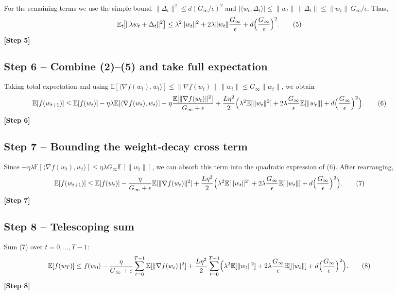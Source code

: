 \documentclass[11pt]{article}
\newcommand{\E}{\mathbb{E}}
\begin{document}
For the remaining terms we use the simple bound
$\|\Delta_{t}\|^{2}\le d(G_{\infty}/\epsilon)^{2}$ and
$|\langle w_{t},\Delta_{t}\rangle|\le\|w_{t}\|\,\|\Delta_{t}\|
\le \|w_{t}\|\,G_{\infty}/\epsilon$.
Thus,
\begin{align}
\E_{t}\!\bigl[\|\lambda w_{t}+\Delta_{t}\|^{2}\bigr]
&\le \lambda^{2}\|w_{t}\|^{2}
+2\lambda\|w_{t}\|\frac{G_{\infty}}{\epsilon}
+d\Bigl(\frac{G_{\infty}}{\epsilon}\Bigr)^{2}. \tag{5}
\end{align}
\textbf{[Step 5]}

\subsection*{Step 6 – Combine (2)–(5) and take full expectation}
Taking total expectation and using $\E[\langle\nabla f(w_{t}),w_{t}\rangle]\le
\|\nabla f(w_{t})\|\,\|w_{t}\|\le G_{\infty}\|w_{t}\|$, we obtain
\begin{align}
\E[f(w_{t+1})]
&\le \E[f(w_{t})]
-\eta\lambda\E[\langle\nabla f(w_{t}),w_{t}\rangle]
-\eta\frac{\E[\|\nabla f(w_{t})\|^{2}]}{G_{\infty}+\epsilon}
+\frac{L\eta^{2}}{2}\Bigl(
\lambda^{2}\E[\|w_{t}\|^{2}]
+2\lambda\frac{G_{\infty}}{\epsilon}\E[\|w_{t}\|]
+d\Bigl(\frac{G_{\infty}}{\epsilon}\Bigr)^{2}\Bigr). \tag{6}
\end{align}
\textbf{[Step 6]}

\subsection*{Step 7 – Bounding the weight‑decay cross term}
Since $-\eta\lambda\E[\langle\nabla f(w_{t}),w_{t}\rangle]
\le \eta\lambda G_{\infty}\E[\|w_{t}\|]$, we can absorb this term into the
quadratic expression of (6). After rearranging,
\begin{align}
\E[f(w_{t+1})]
&\le \E[f(w_{t})]
-\frac{\eta}{G_{\infty}+\epsilon}\E[\|\nabla f(w_{t})\|^{2}]
+\frac{L\eta^{2}}{2}\Bigl(
\lambda^{2}\E[\|w_{t}\|^{2}]
+2\lambda\frac{G_{\infty}}{\epsilon}\E[\|w_{t}\|]
+d\Bigl(\frac{G_{\infty}}{\epsilon}\Bigr)^{2}\Bigr). \tag{7}
\end{align}
\textbf{[Step 7]}

\subsection*{Step 8 – Telescoping sum}
Sum (7) over $t=0,\dots,T-1$:
\begin{align}
\E[f(w_{T})]
&\le f(w_{0})
-\frac{\eta}{G_{\infty}+\epsilon}\sum_{t=0}^{T-1}\E[\|\nabla f(w_{t})\|^{2}]
+\frac{L\eta^{2}}{2}\sum_{t=0}^{T-1}
\Bigl(\lambda^{2}\E[\|w_{t}\|^{2}]
+2\lambda\frac{G_{\infty}}{\epsilon}\E[\|w_{t}\|]
+d\Bigl(\frac{G_{\infty}}{\epsilon}\Bigr)^{2}\Bigr). \tag{8}
\end{align}
\textbf{[Step 8]}
\end{document}
